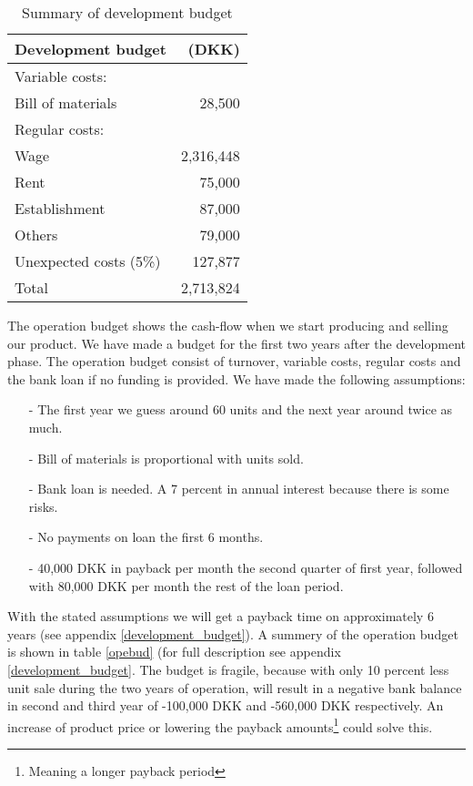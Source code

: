 \begin{table}[h!]
\centering
\begin{tabular}{l r}
Development budget      & (DKK)              \\
\hline                                       
Variable costs:         &                    \\
Bill of materials       &    28,500        \\
Regular costs:          &                           \\
Wage                    &    2,316,448           \\
Rent                    &    75,000          \\
Establishment           &    87,000          \\
Others                  &    79,000          \\
Unexpected costs (5\%)  &    127,877         \\
\hline                      
Total                   &    2,713,824           \\
\end{tabular}
\caption{Summary of development budget}
\label{devbud}
\end{table}


The operation budget shows the cash-flow when we start producing and selling our product. We have made a budget for the first two years after the development phase. The operation budget consist of turnover, variable costs, regular costs and the bank loan if no funding is provided. We have made the following assumptions:
\begin{itemize}
\item[-] The first year we guess around 60 units and the next year around twice as much.
\item[-] Bill of materials is proportional with units sold.
\item[-] Bank loan is needed. A 7 percent in annual interest because there is some risks.
\item[-] No payments on loan the first 6 months.
\item[-] 40,000 DKK in payback per month the second quarter of first year, followed with 80,000 DKK per month the rest of the loan period.
\end{itemize}
With the stated assumptions we will get a payback time on approximately 6 years (see appendix \ref{development_budget}).
A summery of the operation budget is shown in table \ref{opebud} (for full description see appendix \ref{development_budget}.
The budget is fragile, because with only 10 percent less unit sale during the two years of operation, will result in a negative bank balance in second and third year of -100,000 DKK and -560,000 DKK respectively. An increase of product price or lowering the payback amounts\footnote{Meaning a longer payback period} could solve this.  

